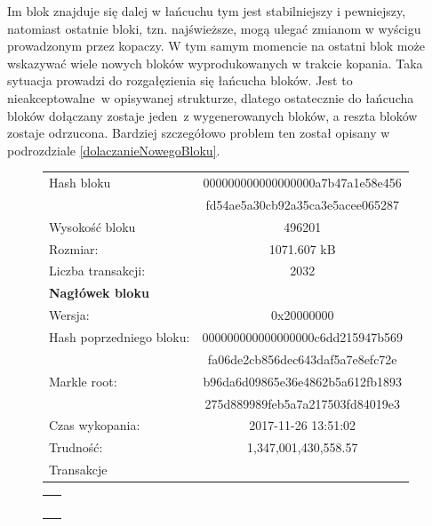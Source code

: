 \documentclass[12pt, twoside, final, openany]{mgr}
\begin{document}
\indent Im blok znajduje się dalej w łańcuchu tym jest stabilniejszy i pewniejszy, natomiast ostatnie bloki, tzn. najświeższe, mogą ulegać zmianom w wyścigu prowadzonym przez kopaczy. W tym samym momencie na ostatni blok może wskazywać wiele nowych bloków wyprodukowanych w trakcie kopania. Taka sytuacja prowadzi do rozgałęzienia się łańcucha bloków. Jest to nieakceptowalne~w opisywanej strukturze, dlatego ostatecznie do łańcucha bloków dołączany zostaje jeden~z wygenerowanych bloków, a reszta bloków zostaje odrzucona. Bardziej szczegółowo problem ten został opisany w podrozdziale \ref{dolaczanieNowegoBloku}.

\begin{figure}
	\begin{center}
  	\begin{tabular}{ | l  c | }
		\hline    
     	Hash bloku & 000000000000000000a7b47a1e58e456 \\
    			    & fd54ae5a30cb92a35ca3e5acee065287 \\ 
    	Wysokość bloku & 496201 \\ 
    	Rozmiar: & 1071.607 kB \\
   	 	Liczba transakcji: & 2032 \\ \hline
		\textbf{Nagłówek bloku}  &  \\  	 	
   	 	Wersja: & 0x20000000 \\   	 	
   	 	Hash poprzedniego bloku: &  000000000000000000c6dd215947b569 \\
    							 &  fa06de2cb856dec643daf5a7e8efc72e \\ 
		Markle root: 			 & b96da6d09865e36e4862b5a612fb1893 \\
								 & 275d889989feb5a7a217503fd84019e3 \\
   		Czas wykopania: & 2017-11-26 13:51:02 \\
   		Trudność: & 1,347,001,430,558.57\\
   		\hline
   		Transakcje &\\
   		\hline 
 	\end{tabular}
	\end{center}
	
	\begin{center}
	\begin{tabular}{c} 
		\big\Downarrow\
	\end{tabular}
	\end{center}
	

\end{figure}
\end{document}
